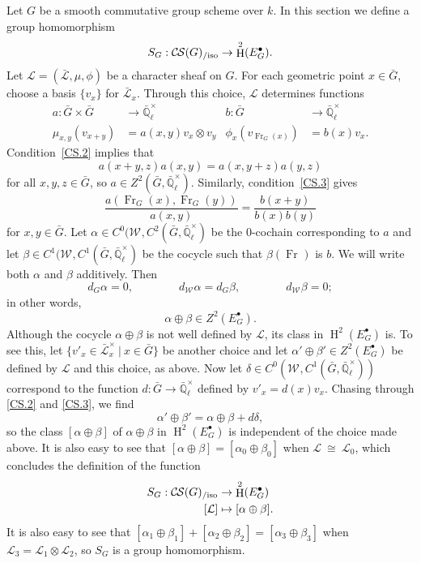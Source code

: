 \documentclass[10pt]{amsart}
\theoremstyle{plain}
\theoremstyle{definition}
\newcommand{\EE}{\mathbb{\bar Q}_\ell}
\newcommand{\Fq}{k}
\newcommand{\EEx}{\EE^\times}
\newcommand{\Weil}[1]{\mathcal{W}_{#1}}
\newcommand{\Frob}[1]{\operatorname{Fr}_{#1}}
\DeclareMathOperator{\Hh}{H}
\newcommand{\tq}{{\ \vert\ }}
\newcommand{\iso}{{\ \cong\ }}
\newcommand{\cs}[1]{{\mathcal{#1}}}
\newcommand{\gcs}[1]{{\mathcal{\bar #1}}}
\newcommand{\CS}{{\mathcal{C\hskip-0.8pt S}}}
\newcommand{\CSiso}[1]{\CS(#1)_{/\text{iso}}}
\newcommand{\bG}{\bar{G}}
\begin{document}
Let $G$ be a smooth commutative group scheme over $\Fq$.
In this section we define a group homomorphism
\[
S_G : \CSiso{G} \to \Hh^2(E^\bullet_G).
\] 
Let $\cs{L} = (\gcs{L},\mu,\phi)$ be a character sheaf on $G$.
For each geometric point $x\in \bG$, choose a basis $\{ v_x \}$ for $\gcs{L}_x$.
Through this choice, $\cs{L}$ determines functions
\begin{align*}
a : \bG\times \bG &\to \EEx & b : \bG &\to \EEx \\
\mu_{x,y}(v_{x+y}) &= a(x,y) v_x \otimes v_y & \phi_x(v_{\Frob{G}(x)}) &= b(x) v_x.
\end{align*}
Condition~\ref{CS.2} implies that
\begin{equation}\label{2-cocyle}
a(x+y,z) a(x,y) = a(x,y+z) a(y,z)
\end{equation}
for all $x,y,z\in \bG$, so $a \in Z^2(\bG,\EEx)$.  Similarly, condition~\ref{CS.3} gives
\begin{equation}\label{eq:nohom}
\frac{a(\Frob{G}(x),\Frob{G}(y))}{a(x,y)} =  \frac{b(x+y)}{b(x) b(y)}
\end{equation}
for $x, y \in \bG$.
Let $\alpha \in C^0(\Weil{},C^2(\bG,\EEx)$ be the $0$-cochain corresponding to $a$ and let $\beta\in C^1(\Weil{},C^1(\bG,\EEx)$
be the cocycle such that $\beta(\Frob{})$ is $b$.  We will write both $\alpha$ and $\beta$ additively.
Then
\[
d_G\alpha =0, \qquad\qquad
d_{\Weil{}} \alpha = d_{G} \beta,\qquad\qquad
d_{\Weil{}} \beta =0;
\]
in other words,
\[\alpha\oplus \beta \in Z^2(E^\bullet_G).\]
Although the cocycle $\alpha\oplus \beta$ is not well defined by $\cs{L}$, its class in $\Hh^2(E^\bullet_G)$ is.
To see this, let $\{ v'_x \in \gcs{L}_x^\times \tq x \in \bG\}$ be another choice and let $\alpha'\oplus \beta' \in Z^2(E^\bullet_G)$
be defined by $\cs{L}$ and this choice, as above.
Now let $\delta \in C^0(\Weil{},C^1(\bG,\EEx))$ correspond to the function $d : \bG\to \EEx$ defined by $v'_x = d(x) v_x$.
Chasing through \ref{CS.2} and \ref{CS.3}, we find
\[
\alpha'\oplus\beta' = \alpha\oplus\beta + d\delta,
\]
so the class $[\alpha\oplus\beta]$ of $\alpha\oplus\beta$ in $\Hh^2(E^\bullet_G)$ is independent of the choice made above.
It is also easy to see that $[\alpha\oplus\beta] = [\alpha_0\oplus\beta_0]$ when $\cs{L} \iso \cs{L}_0$,
which concludes the definition of the function
\begin{align*}
S_G : \CSiso{G} &\to \Hh^2(E^\bullet_G)\\
[\cs{L}] &\mapsto [\alpha\oplus \beta].
\end{align*}
It is also easy to see that $[\alpha_1\oplus\beta_1] + [\alpha_2\oplus\beta_2] = [\alpha_3\oplus\beta_3]$
when $\cs{L}_3 = \cs{L}_1\otimes \cs{L}_2$, so $S_G$ is a group homomorphism.
\end{document}
